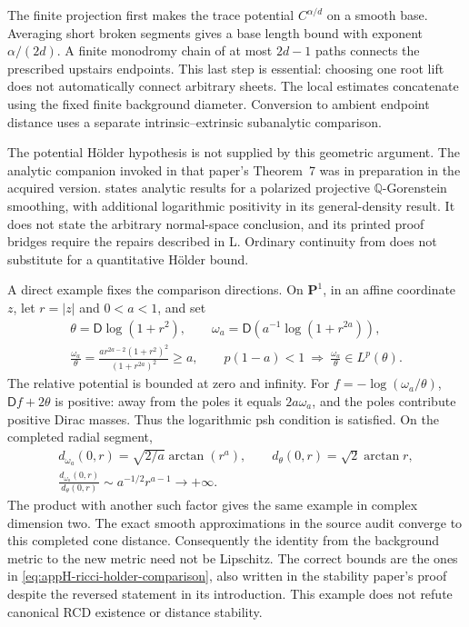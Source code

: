 The finite projection first makes the trace potential
\(C^{\alpha/d}\) on a smooth base. Averaging short broken
segments gives a base length bound with exponent
\(\alpha/(2d)\). A finite monodromy chain of at most
\(2d-1\) paths connects the prescribed upstairs endpoints.
This last step is essential: choosing one root lift does
not automatically connect arbitrary sheets. The local
estimates concatenate using the fixed finite background diameter.
Conversion to ambient endpoint distance uses a separate
intrinsic--extrinsic subanalytic comparison.

The potential Hölder hypothesis is not supplied by this geometric
argument. The analytic companion invoked in that paper's
Theorem~7 was in preparation in the acquired version.
\cite{GKSS25HolderV1} states analytic results for a polarized
projective \(\mathbb Q\)-Gorenstein smoothing, with additional
logarithmic positivity in its general-density result.
It does not state the arbitrary normal-space conclusion,
and its printed proof bridges require the repairs described
in L. Ordinary continuity from \cite{ChoChoi25ContinuityV2}
does not substitute for a quantitative Hölder bound.

A direct example fixes the comparison directions. On
\(\mathbf P^1\), in an affine coordinate \(z\), let \(r=|z|\)
and \(0<a<1\), and set
\[
 \begin{gathered}
 \theta=\mathsf D\log(1+r^2),\qquad
 \omega_a=\mathsf D\!\left(a^{-1}\log(1+r^{2a})\right),\\
 \frac{\omega_a}{\theta}
       =\frac{a r^{2a-2}(1+r^2)^2}{(1+r^{2a})^2}\geq a,\qquad
 p(1-a)<1\ \Longrightarrow\
       \frac{\omega_a}{\theta}\in L^p(\theta).
 \end{gathered}
 \tag{H.172}\label{eq:appH-ricci-cone-density}
\]
The relative potential is bounded at zero and infinity.
For \(f=-\log(\omega_a/\theta)\),
\(\mathsf Df+2\theta\) is positive: away from the poles
it equals \(2a\omega_a\), and the poles contribute positive
Dirac masses. Thus the logarithmic psh condition is satisfied.
On the completed radial segment,
\[
 \begin{gathered}
 d_{\omega_a}(0,r)=\sqrt{2/a}\arctan(r^a),\qquad
 d_\theta(0,r)=\sqrt2\arctan r,\\
 \frac{d_{\omega_a}(0,r)}{d_\theta(0,r)}
              \sim a^{-1/2}r^{a-1}\longrightarrow+\infty .
 \end{gathered}
 \tag{H.173}\label{eq:appH-ricci-cone-distance}
\]
The product with another such factor gives the same example
in complex dimension two. The exact smooth approximations
in the source audit converge to this completed cone distance.
Consequently the identity from the background metric to the
new metric need not be Lipschitz. The correct bounds are the
ones in \eqref{eq:appH-ricci-holder-comparison}, also written
in the stability paper's proof despite the reversed statement
in its introduction. This example does not refute canonical
RCD existence or distance stability.

